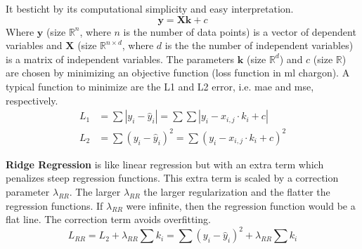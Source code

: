 It besticht by its computational simplicity and easy interpretation. 
\begin{equation}
\mathbf{y} = \mathbf{X} \mathbf{k} +c 
\end{equation}
Where $\mathbf{y}$ (size $\mathbb{R}^n$, where $n$ is the number of data points) is a vector of dependent variables and $\mathbf{X}$ (size $\mathbb{R}^{n\times d}$, where $d$ is the the number of independent variables) is a matrix of independent variables. 
The parameters $\mathbf{k}$ (size $\mathbb{R}^d$) and $c$ (size $\mathbb{R}$) are chosen by minimizing an objective function (loss function in \gls{ml} chargon).
A typical function to minimize are the L1 and L2 error, i.e. \gls{mae} and \gls{mse}, respectively.
\begin{align}
L_1&= \sum |y_i - \hat y_i| = \sum \sum |y_i - x_{i,j}\cdot k_i+c| \\
L_2&= \sum(y_i - \hat y_i)^2 = \sum (y_i - x_{i,j}\cdot k_i+c)^2
\end{align}
%

\textbf{Ridge Regression} is like linear regression but with an extra term which penalizes steep regression functions.
This extra term is scaled by a correction parameter $\lambda_{RR}$. 
The larger $\lambda_{RR}$ the larger regularization and the flatter the regression functions. 
If $\lambda_{RR}$ were infinite, then the regression function would be a flat line. 
The correction term avoids overfitting. 
\begin{equation}
	L_{RR} = L_2 + \lambda_{RR} \sum k_i = \sum(y_i - \hat y_i)^2 + \lambda_{RR} \sum k_i
\end{equation}

